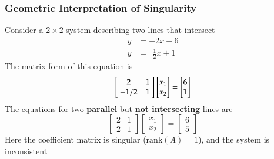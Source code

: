 \documentclass[10pt]{beamer}
\newcommand{\matdim}[2]{\ensuremath{#1\times#2}}
\newcommand{\rank}[1]{\ensuremath{\mathrm{rank}(#1)}}
\begin{document}
\begin{frame}
\frametitle{Geometric Interpretation of Singularity}

Consider a \matdim{2}{2} system describing two lines that intersect
\begin{align*}
    y &= -2x + 6 \\
    y &= \ \ \frac{1}{2} x + 1
\end{align*}
The matrix form of this equation is
\begin{equation*}
    \left[\negthickspace\begin{array}{cr} 2 & 1 \\ -1/2 & 1 \end{array}\negthickspace\right]
    \begin{bmatrix} x_1 \\ x_2 \end{bmatrix}
    =
    \begin{bmatrix} 6 \\ 1 \end{bmatrix}
\end{equation*}
The equations for two \textbf{parallel} but \textbf{not intersecting} lines are
\begin{equation*}
    \begin{bmatrix} 2 & 1 \\ 2 & 1 \end{bmatrix}
    \begin{bmatrix} x_1 \\ x_2 \end{bmatrix}
    =
    \begin{bmatrix} 6 \\ 5 \end{bmatrix}
\end{equation*}
Here the coefficient matrix is singular ($\rank{A}=1$), and
the system is inconsistent

\end{frame}
\end{document}
